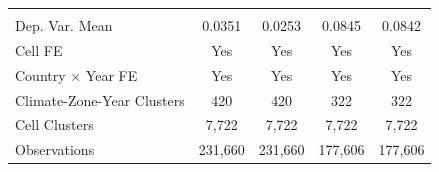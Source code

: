 {\begin{tabular}{l*{4}{c}}
\midrule
\\ Dep. Var. Mean   &0.0351         &0.0253         &0.0845         &0.0842         \\
Cell FE             &   Yes         &   Yes         &   Yes         &   Yes         \\
Country $\times$ Year FE&   Yes         &   Yes         &   Yes         &   Yes         \\
Climate-Zone-Year Clusters&   420         &   420         &   322         &   322         \\
Cell Clusters       & 7,722         & 7,722         & 7,722         & 7,722         \\
Observations        &231,660         &231,660         &177,606         &177,606         \\
\bottomrule
\end{tabular}
}
